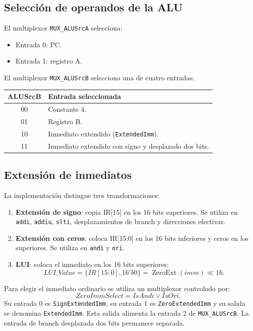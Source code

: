 \documentclass[11pt,a4paper]{article}
\begin{document}
\subsection{Selección de operandos de la ALU}
El multiplexor \texttt{MUX\_ALUSrcA} selecciona:
\begin{itemize}
    \item Entrada 0: PC.
    \item Entrada 1: registro A.
\end{itemize}

El multiplexor \texttt{MUX\_ALUSrcB} selecciona una de cuatro entradas:
\begin{center}
    \begin{tabularx}{0.9\textwidth}{cX}
        \toprule
        \textbf{ALUSrcB} & \textbf{Entrada seleccionada} \\
        \midrule
        00 & Constante 4. \\
        01 & Registro B. \\
        10 & Inmediato extendido (\texttt{ExtendedImm}). \\
        11 & Inmediato extendido con signo y desplazado dos bits. \\
        \bottomrule
    \end{tabularx}
\end{center}

\subsection{Extensión de inmediatos}

La implementación distingue tres transformaciones:
\begin{enumerate}
    \item \textbf{Extensión de signo}: copia IR[15] en los 16 bits superiores. Se utiliza en \texttt{addi}, \texttt{addiu}, \texttt{slti}, desplazamientos de branch y direcciones efectivas.
    \item \textbf{Extensión con ceros}: coloca IR[15:0] en los 16 bits inferiores y ceros en los superiores. Se utiliza en \texttt{andi} y \texttt{ori}.
    \item \textbf{LUI}: coloca el inmediato en los 16 bits superiores:
    \[
        LUI\_Value = \{IR[15:0],16'b0\}= \operatorname{ZeroExt}(imm)\ll16.
    \]
\end{enumerate}

Para elegir el inmediato ordinario se utiliza un multiplexor controlado por:
\[
    ZeroImmSelect = IsAndi \lor IsOri.
\]
Su entrada 0 es \texttt{SignExtendedImm}, su entrada 1 es \texttt{ZeroExtendedImm} y su salida se denomina \texttt{ExtendedImm}. Esta salida alimenta la entrada 2 de \texttt{MUX\_ALUSrcB}. La entrada de branch desplazada dos bits permanece separada.
\end{document}
